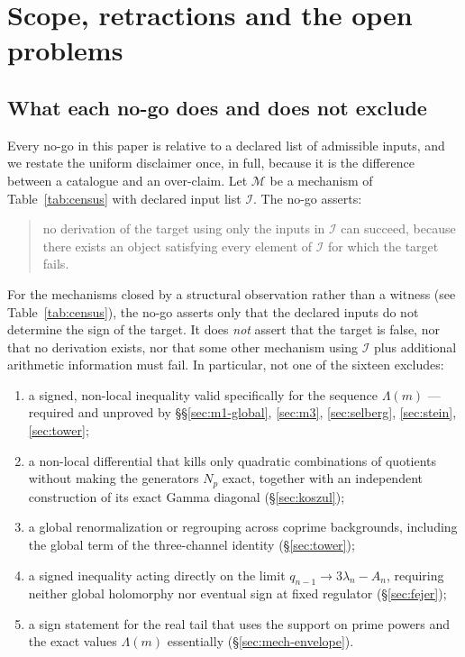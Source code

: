\documentclass[11pt]{amsart}
\theoremstyle{definition}
\theoremstyle{remark}
\theoremstyle{definition}
\begin{document}
\section{Scope, retractions and the open problems}\label{sec:scope}

\subsection{What each no-go does and does not exclude}

Every no-go in this paper is relative to a declared list of admissible inputs, and we restate the
uniform disclaimer once, in full, because it is the difference between a catalogue and an
over-claim. Let $\mathcal M$ be a mechanism of Table~\ref{tab:census} with declared input list
$\mathcal I$. The no-go asserts:
\begin{quote}
no derivation of the target using only the inputs in $\mathcal I$ can succeed, because there exists
an object satisfying every element of $\mathcal I$ for which the target fails.
\end{quote}
For the mechanisms closed by a structural observation rather than a witness (see
Table~\ref{tab:census}), the no-go asserts only that the declared inputs do not determine the
sign of the target.
It does \emph{not} assert that the target is false, nor that no derivation exists, nor that some
other mechanism using $\mathcal I$ plus additional arithmetic information must fail. In particular,
not one of the sixteen excludes:
\begin{enumerate}[label=\textup{(\arabic*)},leftmargin=*]
\item a signed, non-local inequality valid specifically for the sequence $\Lambda(m)$ ---
      required and unproved by \S\S\ref{sec:m1-global}, \ref{sec:m3}, \ref{sec:selberg},
      \ref{sec:stein}, \ref{sec:tower};
\item a non-local differential that kills only quadratic combinations of quotients without making
      the generators $N_p$ exact, together with an independent construction of its exact Gamma
      diagonal (\S\ref{sec:koszul});
\item a global renormalization or regrouping across coprime backgrounds, including the global term
      of the three-channel identity (\S\ref{sec:tower});
\item a signed inequality acting directly on the limit $q_{n-1}\to3\lambda_n-A_n$, requiring
      neither global holomorphy nor eventual sign at fixed regulator (\S\ref{sec:fejer});
\item a sign statement for the real tail that uses the support on prime powers and the exact values
      $\Lambda(m)$ essentially (\S\ref{sec:mech-envelope}).
\end{enumerate}
\end{document}
